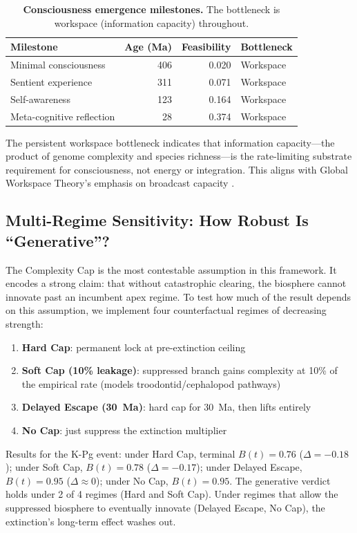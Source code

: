 \documentclass[10pt,letterpaper]{article}
\begin{document}
\begin{table}[H]
\caption{{\bf Consciousness emergence milestones.}
The bottleneck is workspace (information capacity) throughout.}
\begin{tabular}{lrrl}
\toprule
Milestone & Age (Ma) & Feasibility & Bottleneck \\
\midrule
Minimal consciousness & 406 & 0.020 & Workspace \\
Sentient experience & 311 & 0.071 & Workspace \\
Self-awareness & 123 & 0.164 & Workspace \\
Meta-cognitive reflection & 28 & 0.374 & Workspace \\
\bottomrule
\end{tabular}
\end{table}

The persistent workspace bottleneck indicates that information capacity---the
product of genome complexity and species richness---is the rate-limiting
substrate requirement for consciousness, not energy or integration. This aligns
with Global Workspace Theory's emphasis on broadcast capacity \cite{baars1988}.

\subsection*{Multi-Regime Sensitivity: How Robust Is ``Generative''?}

The Complexity Cap is the most contestable assumption in this framework.
It encodes a strong claim: that without catastrophic clearing, the biosphere
cannot innovate past an incumbent apex regime. To test how much of the result
depends on this assumption, we implement four counterfactual regimes of
decreasing strength:

\begin{enumerate}
\item \textbf{Hard Cap}: permanent lock at pre-extinction ceiling
\item \textbf{Soft Cap (10\% leakage)}: suppressed branch gains complexity
      at 10\% of the empirical rate (models troodontid/cephalopod pathways)
\item \textbf{Delayed Escape (30~Ma)}: hard cap for 30~Ma, then lifts entirely
\item \textbf{No Cap}: just suppress the extinction multiplier
\end{enumerate}

Results for the K-Pg event: under Hard Cap, terminal $B(t) = 0.76$ ($\Delta = -0.18$);
under Soft Cap, $B(t) = 0.78$ ($\Delta = -0.17$); under Delayed Escape,
$B(t) = 0.95$ ($\Delta \approx 0$); under No Cap, $B(t) = 0.95$.
The generative verdict holds under 2 of 4 regimes (Hard and Soft Cap).
Under regimes that allow the suppressed biosphere to eventually innovate
(Delayed Escape, No Cap), the extinction's long-term effect washes out.
\end{document}
